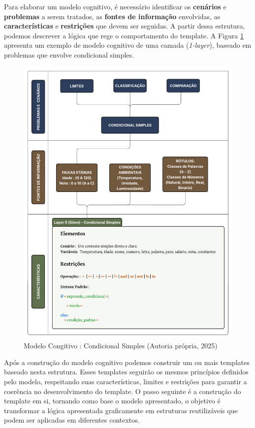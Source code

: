 Para elaborar um modelo cognitivo, é necessário identificar os \textbf{cenários} e \textbf{problemas} a serem tratados, as \textbf{fontes de informação} envolvidas, as \textbf{características} e \textbf{restrições} que devem ser seguidas. A partir dessa estrutura, podemos descrever a lógica que rege o comportamento do template. A Figura \ref{fig:condicional-simples}  apresenta um exemplo de modelo cognitivo de uma camada (\textit{1-layer}), baseado em problemas que envolve condicional simples. 

\begin{figure}[ht]
	\centering
	\includegraphics[width=16cm]{./imagens/capitulo4/modelo-cognitivo-1-layer}
	\caption{Modelo Congitivo : Condicional Simples  (Autoria própria, 2025)}
	\label{fig:condicional-simples}
\end{figure}

Após a construção do modelo cognitivo podemos construir um ou mais templates baseado nesta estrutura. Esses templates seguirão os mesmos princípios definidos pelo modelo, respeitando suas características, limites e restrições para garantir a coerência no desenvolvimento do template.  
O passo seguinte é a construção do template em si, tornando como base o modelo apresentado, o objetivo é transformar a lógica apresentada graficamente em estruturas reutilizáveis que podem ser aplicadas em diferentes contextos. 

